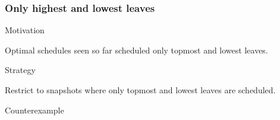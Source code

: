 \documentclass{beamer}
\newenvironment{strategyblock}
{
  \begin{block}{Strategy}
}
{
  \end{block}
}
\newenvironment{motivationblock}
{
  \begin{block}{Motivation}
}
{
  \end{block}
}
\newenvironment{counterexampleblock}
{
  \begin{alertblock}{Counterexample}
}
{
  \end{alertblock}
}
\newcommand{\todo}[1]{ {\color{red}{#1} }}
\begin{document}
\begin{frame}
  \frametitle{Only highest and lowest leaves}
  \begin{motivationblock}
    Optimal schedules seen so far scheduled only topmost and lowest leaves.
  \end{motivationblock}
  \begin{strategyblock}
    Restrict to snapshots where only topmost and lowest leaves are scheduled.
  \end{strategyblock}
  \begin{counterexampleblock}
    \begin{columns}
      \begin{column}{.3\textwidth}
        \begin{center}
          
        \end{center}      
      \end{column}
      \begin{column}{.3\textwidth}
        \begin{center}
          
        \end{center}      
      \end{column}
      \begin{column}{.3\textwidth}
        \begin{center}
          
        \end{center}      
      \end{column}
    \end{columns}
  \end{counterexampleblock}
\end{frame}


\end{document}
